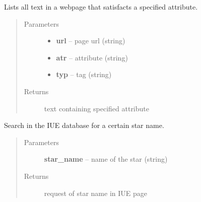 \documentclass[letterpaper,10pt,english]{sphinxmanual}
\begin{document}
\begin{fulllineitems}
\label{index:BeFaVOr_web.get_attribute}
Lists all text in a webpage that satisfacts a specified attribute.
\begin{quote}\begin{description}
\item[{Parameters}] \leavevmode\begin{itemize}
\item {} 
\textbf{url} -- page url (string)

\item {} 
\textbf{atr} -- attribute (string)

\item {} 
\textbf{typ} -- tag (string)

\end{itemize}

\item[{Returns}] \leavevmode
text containing specified attribute

\end{description}\end{quote}

\end{fulllineitems}


\begin{fulllineitems}
\label{index:BeFaVOr_web.iue_submission}
Search in the IUE database for a certain star name.
\begin{quote}\begin{description}
\item[{Parameters}] \leavevmode
\textbf{star\_name} -- name of the star (string)

\item[{Returns}] \leavevmode
request of star name in IUE page

\end{description}\end{quote}

\end{fulllineitems}

\end{document}

